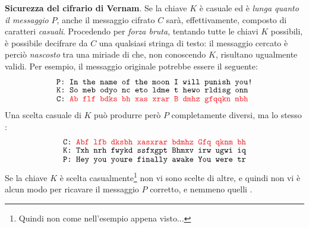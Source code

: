 \documentclass[../../InformazioneQuantistica.tex]{subfiles}
\begin{document}
\begin{expl}
\textbf{Sicurezza del cifrario di Vernam}. Se la chiave $K$ è casuale ed è \textit{lunga quanto il messaggio} $P$, anche il messaggio cifrato $C$ sarà, effettivamente, composto di caratteri \textit{casuali}. Procedendo per \textit{forza bruta}, tentando tutte le chiavi $K$ possibili, è possibile decifrare da $C$ una qualsiasi stringa di testo: il messaggio cercato è perciò \textit{nascosto} tra una miriade di  che, non conoscendo $K$, risultano ugualmente validi. Per esempio, il messaggio originale potrebbe essere il seguente:
\begin{align*}
\underset{\texttt{\normalsize\hspace{-5pt}C: \textcolor{Red}{Ab flf bdks bh xas xrar B dmhz gfqqkn mbh}}}{\underset{\texttt{\normalsize \hspace{-5pt}K: So meb odyo nc eto ldme t hewo rldisg onn}}{\texttt{P: In the name of the moon I will punish you!}}}
\end{align*}
Una scelta casuale di $K$ può produrre però $P$ completamente diversi, ma lo stesso :
\begin{align*}
\underset{\texttt{\normalsize\hspace{-0pt}P: Hey you youre finally awake You were tr}}{\underset{\texttt{\normalsize \hspace{-0pt}K: Txh nrh fwykd ssfxgpt Bhmxv irw ugwi iq}}{\texttt{C: 
\textcolor{Red}{Abf lfb dksbh xasxrar bdmhz Gfq qknm bh}}}}
\end{align*}
Se la chiave $K$ è scelta casualmente\footnote{Quindi non come nell'esempio appena visto...} non vi sono scelte  di altre, e quindi non vi è alcun modo per ricavare il messaggio $P$ corretto, e nemmeno quelli .\\


\end{expl}
\end{document}
